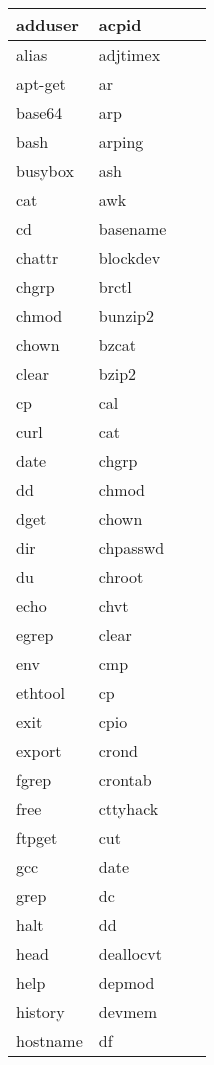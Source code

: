 \begin{longtable}{llp{120mm}p{120mm}}
     adduser & acpid  \\
     \hline
     alias & adjtimex  \\
     \hline
     apt-get & ar  \\
     \hline
     base64 & arp  \\
     \hline
     bash & arping  \\
     \hline
     busybox & ash  \\
     \hline
     cat & awk  \\
     \hline
     cd & basename  \\
     \hline
     chattr & blockdev  \\
     \hline
     chgrp & brctl  \\
     \hline
     chmod & bunzip2  \\
     \hline
     chown & bzcat  \\
     \hline
     clear & bzip2  \\
     \hline
     cp & cal  \\
     \hline
     curl & cat  \\
     \hline
     date & chgrp  \\
     \hline
     dd & chmod  \\
     \hline
     dget & chown  \\
     \hline
     dir & chpasswd \\
     \hline
     du & chroot \\
     \hline
     echo & chvt \\
     \hline
     egrep & clear \\
     \hline
     env & cmp \\
     \hline
     ethtool & cp \\
     \hline
     exit & cpio \\
     \hline
     export & crond \\
     \hline
     fgrep & crontab \\
     \hline
     free & cttyhack \\
     \hline
     ftpget & cut \\
     \hline
     gcc & date \\
     \hline
     grep & dc \\
     \hline
     halt & dd \\
     \hline
     head & deallocvt \\
     \hline
     help & depmod \\
     \hline
     history & devmem \\
     \hline
     hostname & df \\

\end{longtable}
